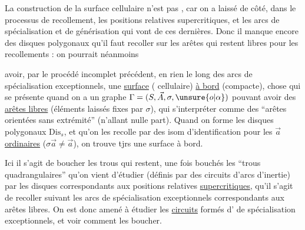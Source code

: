
La construction de la surface cellulaire n'est pas , car on a laissé de côté, dans le processus de recollement, les positions relatives supercritiques, et les arcs de spécialisation et de générisation qui vont  de ces dernières. Donc  il manque encore des disques polygonaux qu'il faut recoller sur les arêtes qui restent libres pour les recollements : on pourrait néanmoins

avoir, par le procédé incomplet précédent, en  rien le long des arcs de spécialisation exceptionnels, une \uline{surface} ( cellulaire) \uline{à bord} (compacte), chose qui se présente quand on a un graphe $\Gamma=(S,\vec A,\sigma,\unsure{o|\alpha})$ pouvant avoir des  \uline{arêtes libres} (éléments  laissés fixes par $\sigma$), qui  s'interpréter comme des ``arêtes orientées sans extrémité'' (n'allant nulle part). Quand on forme les disques polygonaux $\mathrm{Dis}_s$, et qu'on les recolle par des isom d'identification pour les $\vec a$ \uline{ordinaires} ($\sigma\vec a\ne\vec a$), on trouve tjrs une surface à bord.

Ici il s'agit de boucher les trous qui restent,  une fois bouchés les ``trous quadrangulaires'' qu'on vient d'étudier (définis par des circuits d'arcs d'inertie) par les disques correspondants aux positions relatives \uline{supercritiques}, qu'il s'agit de recoller  suivant les arcs de spécialisation exceptionnels correspondants aux arêtes libres. On est donc amené à étudier les \uline{circuits} formés d' de spécialisation exceptionnels, et voir comment les boucher.

